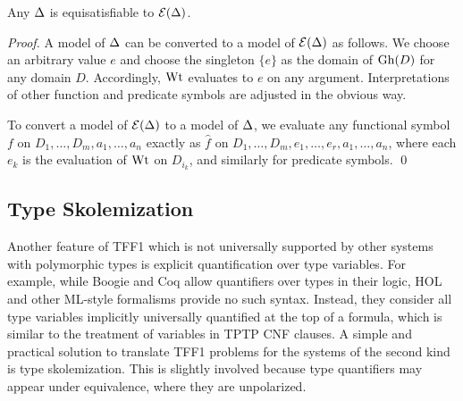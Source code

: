 \begin{theorem} \label{thm:eli}
Any $\mathrm{\Delta}$ is equisatisfiable to $\mathcal{E}(\mathrm{\Delta})$.
\end{theorem}
\begin{proof}
A model of $\mathrm{\Delta}$ can be converted to a model of $\mathcal{E}(\mathrm{\Delta})$
as follows. We choose an arbitrary value $e$ and choose the singleton
$\{ e \}$ as the domain of $\mathrm{Gh}(D)$ for any domain $D$.
Accordingly, $\mathrm{Wt}$ evaluates to $e$ on any argument.
Interpretations of other function and predicate symbols are
adjusted in the obvious way.

To convert a model of $\mathcal{E}(\mathrm{\Delta})$
to a model of $\mathrm{\Delta}$, we evaluate any functional symbol
$f$ on $D_1,\dots,D_m,a_1,\dots,a_n$ exactly as
$\hat{f}$ on $D_1,\dots,D_m,e_1,\dots,e_r,a_1,\dots,a_n$,
where each $e_k$ is the evaluation of $\mathrm{Wt}$ on $D_{i_k}$, and similarly
for predicate symbols.
\qed
\end{proof}

\subsection{Type Skolemization} \label{ssec:skol}

Another feature of TFF1 which is not universally supported
by other systems with polymorphic types is explicit
quantification over type variables.
For example, while Boogie and Coq \cite{xxx} allow quantifiers over types
in their logic,
%
HOL and other ML-style formalisms provide no such syntax.
Instead, they consider all type variables
implicitly universally quantified at the top of a formula, which is similar to
the treatment of variables in TPTP CNF clauses.
A simple and practical solution to translate TFF1 problems
for the systems of the second kind is type skolemization. This is slightly
involved because type quantifiers may appear under equivalence, where they are
unpolarized.


